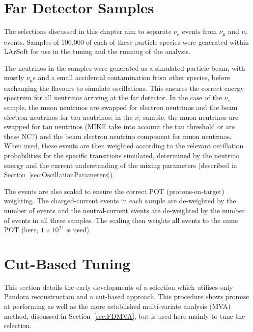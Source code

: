 \section{Far Detector Samples}\label{sec:FDSamples}

The selections discussed in this chapter aim to separate $\nu_e$ events from $\nu_{\mu}$ and $\nu_{\tau}$ events.  Samples of 100,000 of each of these particle species were generated within LArSoft for use in the tuning and the running of the analysis.

The neutrinos in the samples were generated as a simulated particle beam, with mostly $\nu_{\mu}$s and a small accidental contamination from other species, before exchanging the flavours to simulate oscillations.  This ensures the correct energy spectrum for all neutrinos arriving at the far detector.  In the case of the $\nu_e$ sample, the muon neutrinos are swapped for electron neutrinos and the beam electron neutrinos for tau neutrinos; in the $\nu_{\tau}$ sample, the muon neutrinos are swapped for tau neutrinos (MIKE take into account the tau threshold or are these NC?) and the beam electron neutrino component for muon neutrinos.  When used, these events are then weighted according to the relevant oscillation probabilities for the specific transitions simulated, determined by the neutrino energy and the current understanding of the mixing parameters (described in Section~\ref{sec:OscillationParameters}).

The events are also scaled to ensure the correct POT (protons-on-target) weighting.  The charged-current events in each sample are de-weighted by the number of events and the neutral-current events are de-weighted by the number of events in all three samples.  The scaling then weights all events to the same POT (here, $1\times10^{21}$ is used).

\section{Cut-Based Tuning}\label{sec:FDCut}

This section details the early developments of a selection which utilises only Pandora reconstruction and a cut-based approach.  This procedure shows promise at performing as well as the more established multi-variate analysis (MVA) method, discussed in Section~\ref{sec:FDMVA}, but is used here mainly to tune the selection.


